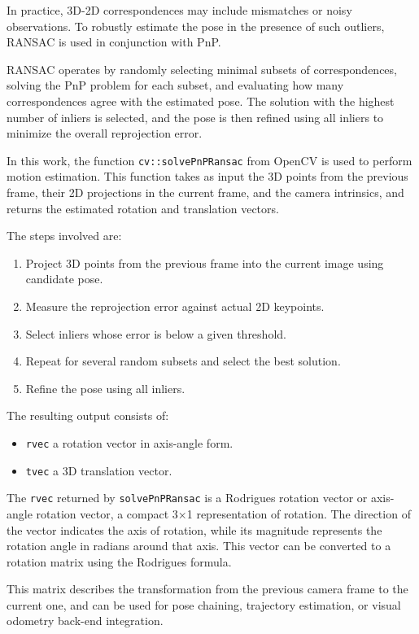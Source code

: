 In practice, 3D-2D correspondences may include mismatches or noisy observations. To robustly estimate 
the pose in the presence of such outliers, \gls{RANSAC} is used in conjunction 
with \gls{PnP}.

\gls{RANSAC} operates by randomly selecting minimal subsets of correspondences, solving the \gls{PnP} problem for 
each subset, and evaluating how many correspondences agree with the estimated pose. The solution with 
the highest number of inliers is selected, and the pose is then refined using all inliers to minimize 
the overall reprojection error.

In this work, the function \texttt{cv::solvePnPRansac} from OpenCV is used to perform motion estimation. 
This function takes as input the 3D points from the previous frame, their 2D projections in the current 
frame, and the camera intrinsics, and returns the estimated rotation and translation vectors.

The steps involved are:
\begin{enumerate}
  \item Project 3D points from the previous frame into the current image using candidate pose.
  \item Measure the reprojection error against actual 2D keypoints.
  \item Select inliers whose error is below a given threshold.
  \item Repeat for several random subsets and select the best solution.
  \item Refine the pose using all inliers.
\end{enumerate}

The resulting output consists of:
\begin{itemize}
  \item \texttt{rvec} a rotation vector in axis-angle form.
  \item \texttt{tvec} a 3D translation vector.
\end{itemize}

The \texttt{rvec} returned by \texttt{solvePnPRansac} is a Rodrigues rotation vector or axis-angle rotation vector, 
a compact 3×1 representation of rotation. The direction of the vector indicates the axis of rotation, while its 
magnitude represents the rotation angle in radians around that axis. This vector can be converted to a rotation matrix
using the Rodrigues formula.

This matrix describes the transformation from the previous camera frame to the current one, and can 
be used for pose chaining, trajectory estimation, or visual odometry back-end integration.


